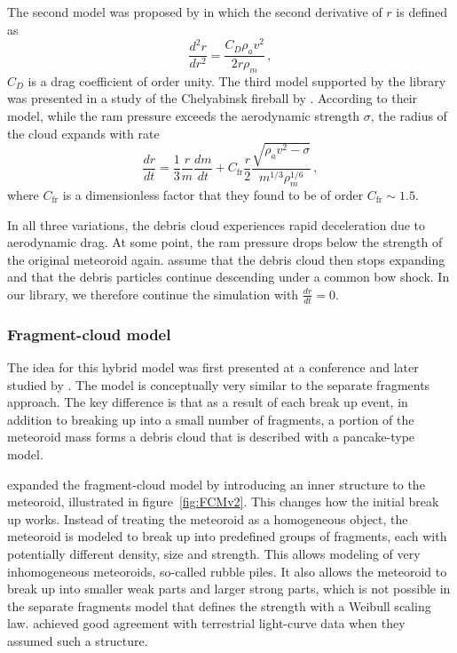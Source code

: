 The second model was proposed by \cite{chyba1993tunguska} in which the second derivative of $r$ is defined as
\begin{equation}
    \frac{d^2r}{dr^2} = \frac{C_D \rho_a v^2}{2r\rho_m}\,,
    \label{eq:PM}
\end{equation}
$C_D$ is a drag coefficient of order unity. The third model supported by the library was presented in a study of the Chelyabinsk fireball by \cite{avramenko2014simulation}. According to their model, while the ram pressure exceeds the aerodynamic strength $\sigma$, the radius of the cloud expands with rate
\begin{equation}
    \frac{dr}{dt} = \frac{1}{3}\frac{r}{m} \frac{dm}{dt} +  C_\mathrm{fr} \frac{r}{2} \frac{\sqrt{\rho_a v^2 - \sigma}}{m^{1/3}\rho_m^{1/6}}\,,
    \label{eq:CRM}
\end{equation}
where $C_\mathrm{fr}$ is a dimensionless factor that they found to be of order $C_\mathrm{fr} \sim 1.5$.

In all three variations, the debris cloud experiences rapid deceleration due to aerodynamic drag. At some point, the ram pressure drops below the strength of the original meteoroid again. \cite{hills1998damage} assume that the debris cloud then stops expanding and that the debris particles continue descending under a common bow shock. In our library, we therefore continue the simulation with $\frac{dr}{dt} = 0$.

\subsubsection{Fragment-cloud model}
\label{sec:fragment_cloud_model}
The idea for this hybrid model was first presented at a conference \citep{mehta2015break} and later studied by \cite{wheeler2017fragmentcloud}.
The model is conceptually very similar to the separate fragments approach.
The key difference is that as a result of each break up event, in addition to breaking up into a small number of fragments, a portion of the meteoroid mass forms a debris cloud that is described with a pancake-type model.

\cite{wheeler2018atmospheric} expanded the fragment-cloud model by introducing an inner structure to the meteoroid, illustrated in figure~\ref{fig:FCMv2}. This changes how the initial break up works. Instead of treating the meteoroid as a homogeneous object, the meteoroid is modeled to break up into predefined groups of fragments, each with potentially different density, size and strength. This allows modeling of very inhomogeneous meteoroids, so-called rubble piles. It also allows the meteoroid to break up into smaller weak parts and larger strong parts, which is not possible in the separate fragments model that defines the strength with a Weibull scaling law. \cite{wheeler2018atmospheric} achieved good agreement with terrestrial light-curve data when they assumed such a structure.

